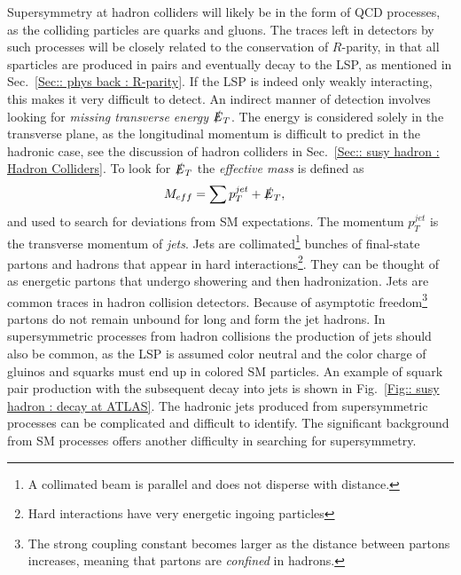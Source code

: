 \documentclass[twoside,english]{uiofysmaster}
\begin{document}
{Supersymmetry at hadron colliders will likely be in the form of QCD processes, as the colliding particles are quarks and gluons. The traces left in detectors by such processes will be closely related to the conservation of $R$-parity, in that all sparticles are produced in pairs and eventually decay to the LSP, as mentioned in Sec.~\ref{Sec:: phys back : R-parity}. If the LSP is indeed only weakly interacting, this makes it very difficult to detect. An indirect manner of detection involves looking for \textit{missing transverse energy} $\slashed{E}_T$. The energy is considered solely in the transverse plane, as the longitudinal momentum is difficult to predict in the hadronic case, see the discussion of hadron colliders in Sec.~\ref{Sec:: susy hadron : Hadron Colliders}. To look for $\slashed{E}_T$ the \textit{effective mass} is defined as
\begin{align}
M_{eff} &= \sum p_T^{jet} + \slashed{E}_T,
\end{align} 
and used to search for deviations from SM expectations. The momentum $p_T^{jet}$ is the transverse momentum of \textit{jets}. Jets are collimated\footnote{A collimated beam is parallel and does not disperse with distance.} bunches of final-state partons and hadrons that appear in hard interactions\footnote{Hard interactions have very energetic ingoing particles}. They can be thought of as energetic partons that undergo showering and then hadronization. Jets are common traces in hadron collision detectors. Because of asymptotic freedom\footnote{The strong coupling constant becomes larger as the distance between partons increases, meaning that partons are \textit{confined} in hadrons.} partons do not remain unbound for long and form the jet hadrons. In supersymmetric processes from hadron collisions the production of jets should also be common, as the LSP is assumed color neutral and the color charge of gluinos and squarks must end up in colored SM particles. An example of squark pair production with the subsequent decay into jets is shown in Fig.~\ref{Fig:: susy hadron : decay at ATLAS}. The hadronic jets produced from supersymmetric processes can be complicated and difficult to identify. The significant background from SM processes offers another difficulty in searching for supersymmetry. 

}
\end{document}
